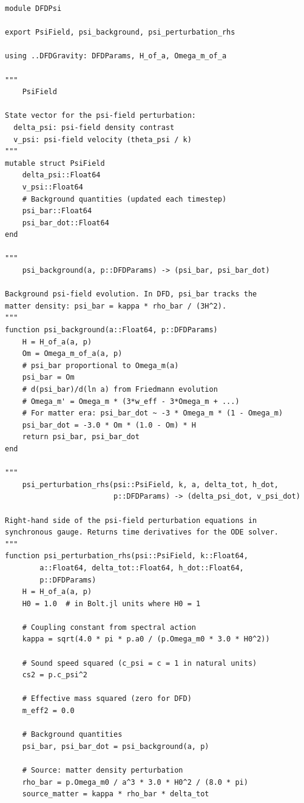 \documentclass[11pt,a4paper]{article}
\begin{document}
\begin{lstlisting}[caption={DFDPsi.jl --- Dynamical psi-field species for Bolt.jl},label=lst:dfdpsi]
module DFDPsi

export PsiField, psi_background, psi_perturbation_rhs

using ..DFDGravity: DFDParams, H_of_a, Omega_m_of_a

"""
    PsiField

State vector for the psi-field perturbation:
  delta_psi: psi-field density contrast
  v_psi: psi-field velocity (theta_psi / k)
"""
mutable struct PsiField
    delta_psi::Float64
    v_psi::Float64
    # Background quantities (updated each timestep)
    psi_bar::Float64
    psi_bar_dot::Float64
end

"""
    psi_background(a, p::DFDParams) -> (psi_bar, psi_bar_dot)

Background psi-field evolution. In DFD, psi_bar tracks the
matter density: psi_bar = kappa * rho_bar / (3H^2).
"""
function psi_background(a::Float64, p::DFDParams)
    H = H_of_a(a, p)
    Om = Omega_m_of_a(a, p)
    # psi_bar proportional to Omega_m(a)
    psi_bar = Om
    # d(psi_bar)/d(ln a) from Friedmann evolution
    # Omega_m' = Omega_m * (3*w_eff - 3*Omega_m + ...)
    # For matter era: psi_bar_dot ~ -3 * Omega_m * (1 - Omega_m)
    psi_bar_dot = -3.0 * Om * (1.0 - Om) * H
    return psi_bar, psi_bar_dot
end

"""
    psi_perturbation_rhs(psi::PsiField, k, a, delta_tot, h_dot,
                         p::DFDParams) -> (delta_psi_dot, v_psi_dot)

Right-hand side of the psi-field perturbation equations in
synchronous gauge. Returns time derivatives for the ODE solver.
"""
function psi_perturbation_rhs(psi::PsiField, k::Float64,
        a::Float64, delta_tot::Float64, h_dot::Float64,
        p::DFDParams)
    H = H_of_a(a, p)
    H0 = 1.0  # in Bolt.jl units where H0 = 1

    # Coupling constant from spectral action
    kappa = sqrt(4.0 * pi * p.a0 / (p.Omega_m0 * 3.0 * H0^2))

    # Sound speed squared (c_psi = c = 1 in natural units)
    cs2 = p.c_psi^2

    # Effective mass squared (zero for DFD)
    m_eff2 = 0.0

    # Background quantities
    psi_bar, psi_bar_dot = psi_background(a, p)

    # Source: matter density perturbation
    rho_bar = p.Omega_m0 / a^3 * 3.0 * H0^2 / (8.0 * pi)
    source_matter = kappa * rho_bar * delta_tot


\end{lstlisting}
\end{document}
